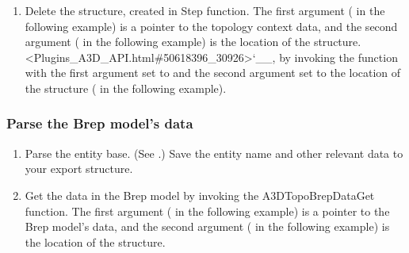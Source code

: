 \documentclass[letterpaper,12pt,english,openany,oneside]{sphinxmanual}
\begin{document}
\begin{sphinxVerbatim}[commandchars=\\\{\}]
  
\end{sphinxVerbatim}
\begin{enumerate}
%
\setcounter{enumi}{3}
\item {} 
Delete the  structure, created in Step  function. The first argument ( in the following example) is a pointer to the topology context data, and the second argument ( in the following example) is the location of the  structure. <Plugins\_A3D\_API.html\#50618396\_30926>`\_\_, by invoking the  function with the first argument set to  and the second argument set to the location of the structure ( in the following example).

\end{enumerate}

\begin{sphinxVerbatim}[commandchars=\\\{\}]
 
\end{sphinxVerbatim}


\subsubsection{Parse the Brep model’s data}
\label{\detokenize{Plugins_A3D_API:parse-the-brep-model-s-data}}\begin{enumerate}
%
\item {} 
Parse the entity base. (See .) Save the entity name and other relevant data to your export structure.

\item {} 
Get the data in the Brep model by invoking the A3DTopoBrepDataGet function. The first argument ( in the following example) is a pointer to the Brep model’s data, and the second argument ( in the following example) is the location of the  structure.

\end{enumerate}
\end{document}
